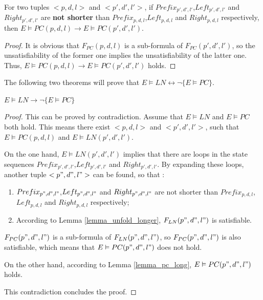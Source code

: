 \documentclass[journal]{IEEEtran}
\begin{document}
\begin{lemma}[]\label{lemma_pc_long}
For two tuples $<p,d,l>$ and $<p',d',l'>$,
if $Prefix_{p',d',l'}$,$Left_{p',d',l'}$ and $Right_{p',d',l'}$ are \textbf{not shorter} than $Prefix_{p,d,l}$,$Left_{p,d,l}$ and $Right_{p,d,l}$ respectively,
then $E\vDash PC(p,d,l)\to E\vDash PC(p',d',l')$.
\end{lemma}
\begin{proof}
It is obvious that $F_{PC}(p,d,l)$ is a sub-formula of $F_{PC}(p',d',l')$,
so the unsatisfiability of the former one implies the unsatisfiability of the latter one.
Thus,
$E\vDash PC(p,d,l)\to E\vDash PC(p',d',l')$ holds.
\end{proof}

The following two theorems will prove that $E\vDash LN\leftrightarrow \neg \{E\vDash PC\}$.



\begin{theorem}[]\label{thm_pc_nln}
$E\vDash LN\to \neg \{E\vDash PC\}$
\end{theorem}
\begin{proof}
This can be proved by contradiction.
Assume that $E\vDash LN$ and $E\vDash PC$ both hold.
This means there exist $<p,d,l>$ and $<p',d',l'>$,
such that $E\vDash PC(p,d,l)$ and $E\vDash LN(p',d',l')$.

On the one hand,
$E\vDash LN(p',d',l')$ implies that there are loops in the state sequences $Prefix_{p',d',l'}$,$Left_{p',d',l'}$ and $Right_{p',d',l'}$.
By expanding these loops,
another tuple $<p",d",l">$ can be found,
so that :
\begin{enumerate}
\item $Prefix_{p",d",l"}$,$Left_{p",d",l"}$ and $Right_{p",d",l"}$ are not shorter than $Prefix_{p,d,l}$,$Left_{p,d,l}$ and $Right_{p,d,l}$ respectively;
\item According to Lemma \ref{lemma_unfold_longer},
$F_{LN}(p",d",l")$ is satisfiable.
\end{enumerate}

$F_{PC}(p",d",l")$ is a sub-formula of $F_{LN}(p",d",l")$,
so $F_{PC}(p",d",l")$ is also satisfiable,
which means that $E\vDash PC(p",d",l")$ does not hold.

On the other hand,
according to Lemma \ref{lemma_pc_long},
$E\vDash PC(p",d",l")$ holds.

This contradiction concludes the proof.
\end{proof}
\end{document}
